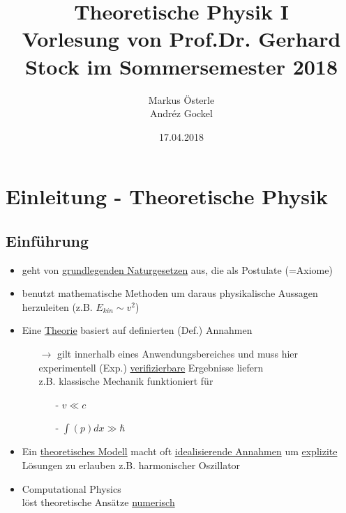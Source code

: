 \documentclass[titlepage,12pt,a4paper,ngerman]{report}
\begin{document}
\title{
	\Huge Theoretische Physik I \\[1em]
	\Large Vorlesung von Prof.Dr. Gerhard Stock im Sommersemester 2018}
\author{Markus Österle \\ Andréz Gockel}
\date{17.04.2018}
\maketitle
\tableofcontents

\chapter*{Einleitung - Theoretische Physik}

\section*{Einführung}
\begin{itemize}
	\item geht von \underline{grundlegenden Naturgesetzen} aus, die als Postulate (=Axiome)
	\item benutzt mathematische Methoden um daraus physikalische Aussagen herzuleiten (z.B. $E_{kin}\sim v^2$) 
	\item Eine \underline{Theorie} basiert auf definierten (Def.) Annahmen
	\begin{itemize}
		\item[$\rightarrow$] gilt innerhalb eines Anwendungsbereiches und muss hier experimentell (Exp.) \underline{verifizierbare} Ergebnisse liefern\\
		z.B. klassische Mechanik funktioniert für
		\begin{itemize}
			\item[-] $v\ll c$
			\item[-] $\int(p)dx \gg \hbar$
		\end{itemize}
	\end{itemize}
	\item Ein \underline{theoretisches Modell} macht oft \underline{idealisierende Annahmen} um \underline{explizite} Lösungen zu erlauben z.B. harmonischer Oszillator
	\item Computational Physics\\
	löst theoretische Ansätze \underline{numerisch}
\end{itemize}
\end{document}
